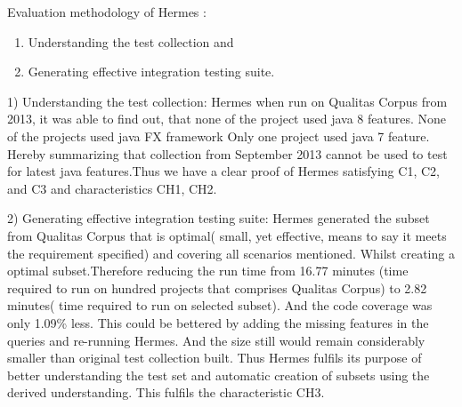 \documentclass[authoryear,preprint]{sigplanconf}
\begin{document}
\begin{table*}[h]
	\centering
	\captionsetup{justification=centering}
	\caption{Characteristics available within each approach}
\label{tbl1}
\end{table*}

Evaluation methodology of Hermes : 
\begin{enumerate}
	\item Understanding the test collection and 
	\item Generating effective integration testing suite.
\end{enumerate}

1) Understanding the test collection:
Hermes when run on Qualitas Corpus from 2013, it was able to find out, that none of the project used java 8 features. None of the projects used java FX framework Only one project used java 7 feature. Hereby summarizing that collection from September 2013 cannot be used to test for latest java features.Thus we have a clear proof of Hermes satisfying C1, C2, and C3 and characteristics CH1, CH2.

2) Generating effective integration testing suite:
Hermes generated the subset from Qualitas Corpus that is optimal( small, yet effective, means to say it meets the requirement specified) and covering all scenarios mentioned. Whilst creating a optimal subset.Therefore reducing the run time from 16.77 minutes (time required to run on hundred projects that comprises Qualitas Corpus) to 2.82 minutes( time required to run on selected subset). And the code coverage was only 1.09\% less. This could be bettered by adding the missing features in the queries and re-running Hermes. And the size still would remain considerably smaller than original test collection built. Thus Hermes fulfils its purpose of better understanding the test set and automatic creation of subsets using the derived understanding. This fulfils the characteristic CH3.
\end{document}
